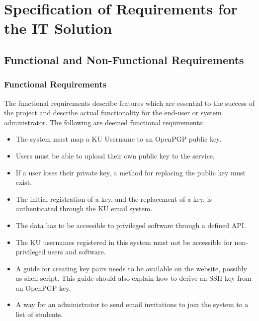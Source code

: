 \documentclass[11pt,a4paper]{report}
\begin{document}
\renewcommand{\thesubsection}{\thesection.\alph{subsection}}
\section{Specification of Requirements for the IT Solution}
\subsection{Functional and Non-Functional Requirements}
\subsubsection{Functional Requirements}
The functional requirements describe features which are essential to the success of the project and describe actual functionality for the end-user or system administrator. The following are deemed functional requirements:
\begin{itemize}
\item The system must map a KU Username to an OpenPGP public key.
\item Users must be able to upload their own public key to the service.
\item If a user loses their private key, a method for replacing the public key must exist.
\item The initial registration of a key, and the replacement of a key, is authenticated through the KU email system.
\item The data has to be accessible to privileged software through a defined API.
\item The KU usernames registered in this system must not be accessible for non-privileged users and software.
\item A guide for creating key pairs needs to be available on the website, possibly as shell script. This guide should also explain how to derive an SSH key from an OpenPGP key.
\item A way for an administrator to send email invitations to join the system to a list of students.
\end{itemize}
\end{document}
